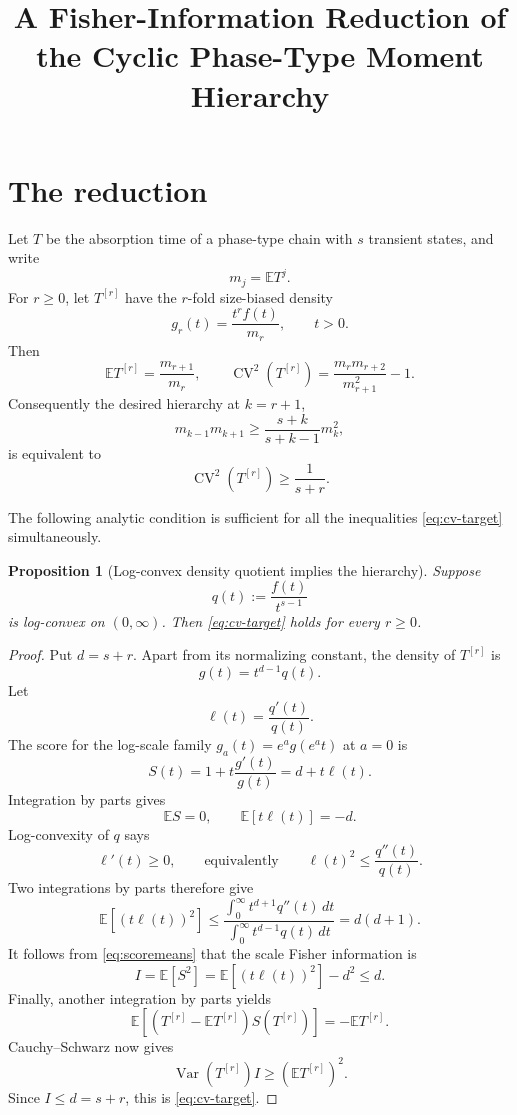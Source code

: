 \documentclass[11pt]{article}
\title{A Fisher-Information Reduction of the Cyclic Phase-Type Moment Hierarchy}
\author{}
\date{}
\newcommand{\E}{\mathbb E}
\newcommand{\Var}{\operatorname{Var}}
\newcommand{\CV}{\operatorname{CV}}
\newtheorem{proposition}[theorem]{Proposition}
\theoremstyle{remark}
\begin{document}
\maketitle

\section{The reduction}

Let \(T\) be the absorption time of a phase-type chain with \(s\) transient
states, and write
\[
  m_j=\E T^j.
\]
For \(r\geq0\), let \(T^{[r]}\) have the \(r\)-fold size-biased density
\[
  g_r(t)=\frac{t^r f(t)}{m_r},\qquad t>0.
\]
Then
\[
  \E T^{[r]}=\frac{m_{r+1}}{m_r},\qquad
  \CV^2(T^{[r]})
  =\frac{m_rm_{r+2}}{m_{r+1}^2}-1.
\]
Consequently the desired hierarchy at \(k=r+1\),
\[
  m_{k-1}m_{k+1}\geq
  \frac{s+k}{s+k-1}m_k^2,
\]
is equivalent to
\begin{equation}\label{eq:cv-target}
  \CV^2(T^{[r]})\geq\frac1{s+r}.
\end{equation}

The following analytic condition is sufficient for all the inequalities
\eqref{eq:cv-target} simultaneously.

\begin{proposition}[Log-convex density quotient implies the hierarchy]
\label{prop:fisher}
Suppose
\begin{equation}\label{eq:qdef}
  q(t):=\frac{f(t)}{t^{s-1}}
\end{equation}
is log-convex on \((0,\infty)\).  Then \eqref{eq:cv-target} holds for every
\(r\geq0\).
\end{proposition}

\begin{proof}
Put \(d=s+r\).  Apart from its normalizing constant, the density of
\(T^{[r]}\) is
\[
  g(t)=t^{d-1}q(t).
\]
Let
\[
  \ell(t)=\frac{q'(t)}{q(t)}.
\]
The score for the log-scale family \(g_a(t)=e^a g(e^a t)\) at \(a=0\) is
\[
  S(t)=1+t\frac{g'(t)}{g(t)}=d+t\ell(t).
\]
Integration by parts gives
\begin{equation}\label{eq:scoremeans}
  \E S=0,\qquad \E[t\ell(t)]=-d.
\end{equation}
Log-convexity of \(q\) says
\[
  \ell'(t)\geq0,
  \qquad\text{equivalently}\qquad
  \ell(t)^2\leq\frac{q''(t)}{q(t)}.
\]
Two integrations by parts therefore give
\[
  \E[(t\ell(t))^2]
  \leq
  \frac{\int_0^\infty t^{d+1}q''(t)\,dt}
       {\int_0^\infty t^{d-1}q(t)\,dt}
  =d(d+1).
\]
It follows from \eqref{eq:scoremeans} that the scale Fisher information is
\[
  I=\E[S^2]
   =\E[(t\ell(t))^2]-d^2
   \leq d.
\]
Finally, another integration by parts yields
\[
  \E[(T^{[r]}-\E T^{[r]})S(T^{[r]})]
  =-\E T^{[r]}.
\]
Cauchy--Schwarz now gives
\[
  \Var(T^{[r]})I\geq(\E T^{[r]})^2.
\]
Since \(I\leq d=s+r\), this is \eqref{eq:cv-target}.
\end{proof}
\end{document}
